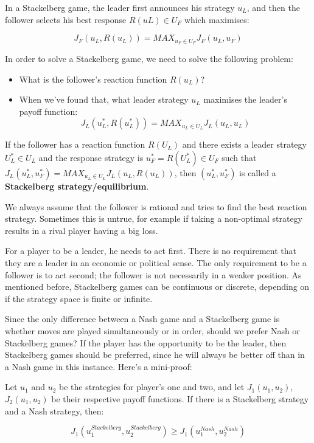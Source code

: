 
In a Stackelberg game, the leader first announces his strategy $u_L$, and then
the follower selects his best response $R(uL) \in U_F$ which maximises:

\[
  J_F(u_L, R(u_L)) = MAX_{u_F \in U_F} J_F(u_L, u_F)
\]

In order to solve a Stackelberg game, we need to solve the following problem:

\begin{itemize}
  \item What is the follower's reaction function $R(u_L)$?
  \item When we've found that, what leader strategy $u_L$ maximises the leader's
  payoff function:
  \[
    J_L(u^*_L, R(u^*_L)) = MAX_{u_L \in U_L} J_L(u_L, u_L)
  \]
\end{itemize}

If the follower has a reaction function $R(U_L)$ and there exists a leader
strategy $U^*_L \in U_L$ and the response strategy is $u^*_F = R(U^*_L) \in U_F$
such that $J_L(u^*_L, u^*_F) = MAX_{u_L \in U_L} J_L(u_L, R(u_L))$, then
$(u^*_L, u^*_F)$ is called a \textbf{Stackelberg strategy/equilibrium}.

We always assume that the follower is rational and tries to find the best
reaction strategy. Sometimes this is untrue, for example if taking a non-optimal
strategy results in a rival player having a big loss.

For a player to be a leader, he needs to act first. There is no requirement that
they are a leader in an economic or political sense. The only requirement to be
a follower is to act second; the follower is not necessarily in a weaker
position. As mentioned before, Stackelberg games can be continuous or discrete,
depending on if the strategy space is finite or infinite.

Since the only difference between a Nash game and a Stackelberg game is whether
moves are played simultaneously or in order, should we prefer Nash or
Stackelberg games? If the player has the opportunity to be the leader, then
Stackelberg games should be preferred, since he will always be better off than in
a Nash game in this instance. Here's a mini-proof:

Let $u_1$ and $u_2$ be the strategies for player's one and two, and let
$J_1(u_1, u_2)$, $J_2(u_1, u_2)$ be their respective payoff functions. If there
is a Stackelberg strategy and a Nash strategy, then:

\[
  J_1(u^{Stackelberg}_1, u^{Stackelberg}_2) \geq J_1(u^{Nash}_1, u^{Nash}_2)
\]

